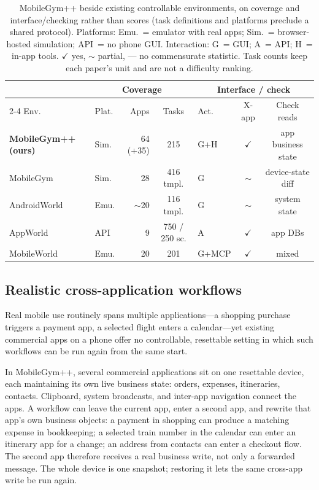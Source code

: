 \begin{table}[t]
\caption{MobileGym++ beside existing controllable environments, on coverage and interface/checking rather than scores (task definitions and platforms preclude a shared protocol). Platforms: Emu.\ = emulator with real apps; Sim.\ = browser-hosted simulation; API\ = no phone GUI. Interaction: G\ = GUI; A\ = API; H\ = in-app tools. $\checkmark$ yes, $\sim$ partial, --- no commensurate statistic. Task counts keep each paper's unit and are not a difficulty ranking.}
\label{tab:mgpp-compare}
\begin{center}
\scriptsize
\setlength{\tabcolsep}{3.5pt}
\begin{tabular}{llrclcc}
\hline
 & \multicolumn{3}{c}{Coverage} & \multicolumn{3}{c}{Interface / check} \\
\cline{2-4} \cline{5-7}
Env. & Plat. & Apps & Tasks & Act. & X-app & Check reads \\
\hline
\textbf{MobileGym++ (ours)} & Sim. & 64 (+35) & 215 & G+H & $\checkmark$ & app business state \\
MobileGym & Sim. & 28 & 416 tmpl. & G & $\sim$ & device-state diff \\
AndroidWorld & Emu. & $\sim$20 & 116 tmpl. & G & $\sim$ & system state \\
AppWorld & API & 9 & 750 / 250 sc. & A & $\checkmark$ & app DBs \\
MobileWorld & Emu. & 20 & 201 & G+MCP & $\checkmark$ & mixed \\
\hline
\end{tabular}
\end{center}
\end{table}

\subsection{Realistic cross-application workflows}
\label{sec:mgpp-crossapp}

Real mobile use routinely spans multiple applications---a shopping purchase triggers a payment app, a selected flight enters a calendar---yet existing commercial apps on a phone offer no controllable, resettable setting in which such workflows can be run again from the same start.

In MobileGym++, several commercial applications sit on one resettable device, each maintaining its own live business state: orders, expenses, itineraries, contacts. Clipboard, system broadcasts, and inter-app navigation connect the apps. A workflow can leave the current app, enter a second app, and rewrite that app's own business objects: a payment in shopping can produce a matching expense in bookkeeping; a selected train number in the calendar can enter an itinerary app for a change; an address from contacts can enter a checkout flow. The second app therefore receives a real business write, not only a forwarded message. The whole device is one snapshot; restoring it lets the same cross-app write be run again.

